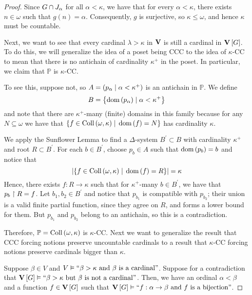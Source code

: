 \documentclass[11pt]{article}
\renewcommand{\P}{\mathbb{P}}
\DeclareMathOperator{\collOp}{Coll}
\newcommand{\coll}[1]{\collOp{\parens{#1}}}
\begin{document}
\begin{proof}
    Since $G \cap J_\alpha$ for all $\alpha < \kappa$, we have that
    for every $\alpha < \kappa$,
    there exists $n \in \omega$ such that $g(n) = \alpha$.
    Consequently, $g$ is surjective, so $\kappa \leq \omega$, and hence
    $\kappa$ must be countable.

    Next, we want to see that every cardinal $\lambda > \kappa$ in $\verum$ is
    still a cardinal in $\m$. To do this, we will generalize the idea of a
    poset being CCC to the idea of $\kappa$-CC to mean that there is no
    antichain of cardinality $\kappa^+$ in the poset. In particular, we claim
    that $\P$ is $\kappa$-CC.

    To see this, suppose not, so $A = ( p_\alpha \;\vert\; \alpha < \kappa^+ )$ is
    an antichain in $\P$.
    We define
    \begin{equation*}
        B = \left\{ \operatorname{dom}{\left(p_\alpha\right)} \;\vert\; \alpha < \kappa^+ \right\}
    \end{equation*}
    and note that there are $\kappa^+$-many (finite) domains in this family
    because for any $N \subseteq \omega$ we have that
    $\setof{ f \in \coll{\omega, \kappa} \sth \dom{f} = N }$
    has cardinality $\kappa$.

    We apply the Sunflower Lemma to find a $\Delta$-system
    $B^\prime \subset B$ with cardinality $\kappa^+$ and root
    $R \subset B^\prime$.
    For each $b \in B^\prime$, choose $p_b \in A$ such that $\operatorname{dom}{\left(p_b\right)} = b$
    and notice that
    \begin{equation*}
        \abs{
            \setof{f \in \coll{\omega, \kappa} \sth \dom{f} = R}
        }
        = \kappa
    \end{equation*}
    Hence, there exists $f : R \to \kappa$ such that for $\kappa^+$-many
    $b \in B^\prime$, we have that $p_b \upharpoonright R = f$.
    Let $b_1, b_2 \in B^\prime$ and notice that $p_{b_1}$ is compatible
    with $p_{b_2}$; their union is a valid finite partial function, since they
    agree on $R$, and forms a lower bound for them.
    But $p_{b_1}$ and $p_{b_2}$ belong to an antichain, so this is a
    contradiction.

    Therefore, $\P = \coll{\omega, \kappa}$ is $\kappa$-CC.
    Next we want to generalize the result that CCC forcing notions preserve
    uncountable cardinals to a result that $\kappa$-CC forcing notions
    preserve cardinals bigger than $\kappa$.

    Suppose $\beta \in V$ and
    $V \vDash \text{``$\beta > \kappa$ and $\beta$ is a cardinal''}$.
    Suppose for a contradiction that
    $\m \models \stmt{$\beta > \kappa$ but $\beta$ is not a cardinal}$.
    Then, we have an ordinal $\alpha < \beta$ and a function $f \in \m$ such
    that $\m \models \stmt{$f : \alpha \to \beta$ and $f$ is a bijection}$.


\end{proof}
\end{document}
